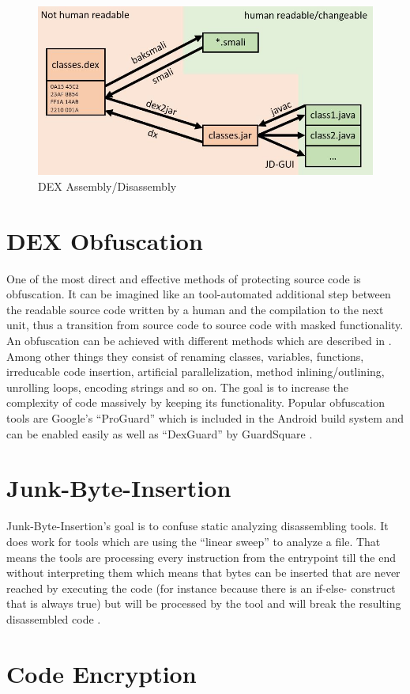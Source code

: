 \begin{figure}[htb]
  \includegraphics[width=\textwidth]{figures/dex_disassembly}
  \caption[DEX Assembly/Disassembly]{DEX Assembly/Disassembly}
  \label{fig:dex_disassembly}
\end{figure}


\section{DEX Obfuscation}
One of the most direct and effective methods of protecting source
code is obfuscation. It can be imagined like an tool-automated
additional step between the readable source code written by a human
and the compilation to the next unit, thus a transition from source
code to source code with masked functionality. An obfuscation
can be achieved with different methods which are described in
\parencite{lvl_imp}. Among other things they consist of renaming
classes, variables, functions, irreducable code insertion,
artificial parallelization, method inlining/outlining, unrolling
loops, encoding strings and so on.
The goal is to increase the complexity of code
massively by keeping its functionality. Popular obfuscation tools
are Google's ``ProGuard'' \parencite{proguardtool} which is included
in the Android build system and can be enabled easily as well as
``DexGuard'' by GuardSquare \parencite{dexguardtool}.

\section{Junk-Byte-Insertion}
Junk-Byte-Insertion's goal is to confuse static analyzing
disassembling tools. It does work for tools which are
using the ``linear sweep'' to analyze a file. That means
the tools are processing every instruction from the entrypoint
till the end without interpreting them which means that bytes can
be inserted that are never reached by executing the code
(for instance because there is an if-else- construct that is
always true) but will be processed by the tool and will break the
resulting disassembled code \parencite{lvl_imp}.

\section{Code Encryption}
